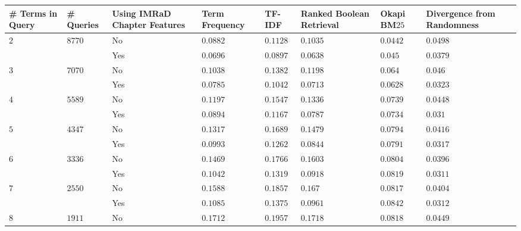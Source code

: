 \begin{table}[h]
  \begin{adjustwidth}{-2cm}{}
    \begin{tabular}{ C{1cm} C{1cm} C{2.1cm}|C{2.1cm} C{2.1cm} C{2.1cm} C{2.1cm} C{2.1cm} }
      \toprule
      \textbf{\# Terms in Query} & \textbf{\# Queries} & \textbf{Using IMRaD Chapter Features} & \textbf{Term Frequency} & \textbf{TF-IDF} & \textbf{Ranked Boolean Retrieval} & \textbf{Okapi BM$25$} & \textbf{Divergence from Randomness} \\ \midrule
       &  & No  & $0.0882$ & $0.1128$ & $0.1035$ & $0.0442$ & \color{blue}$\mathbf{0.0498}$  \\
                                                    && Yes & $0.0696$ & $0.0897$ & $0.0638$ & $0.045$  & \color{Plum}$\mathbf{0.0379}$  \\ \midrule
       &  & No  & $0.1038$ & $0.1382$ & $0.1198$ & $0.064$  & $0.046$   \\
                                                    && Yes & $0.0785$ & $0.1042$ & $0.0713$ & $0.0628$ & $0.0323$  \\ \midrule
       &  & No  & $0.1197$ & $0.1547$ & $0.1336$ & $0.0739$ & $0.0448$  \\
                                                    && Yes & $0.0894$ & $0.1167$ & $0.0787$ & $0.0734$ & $0.031$   \\ \midrule
       &  & No  & $0.1317$ & $0.1689$ & $0.1479$ & $0.0794$ & $0.0416$  \\
                                                    && Yes & $0.0993$ & $0.1262$ & $0.0844$ & $0.0791$ & $0.0317$  \\ \midrule
       &  & No  & $0.1469$ & $0.1766$ & $0.1603$ & $0.0804$ & $0.0396$  \\
                                                    && Yes & $0.1042$ & $0.1319$ & $0.0918$ & $0.0819$ & $0.0311$  \\ \midrule
       &  & No  & $0.1588$ & $0.1857$ & $0.167$  & $0.0817$ & $0.0404$  \\
                                                    && Yes & $0.1085$ & $0.1375$ & $0.0961$ & $0.0842$ & $0.0312$  \\ \midrule
       &  & No  & $0.1712$ & $0.1957$ & $0.1718$ & $0.0818$ & $0.0449$  \\

\end{tabular}
\end{adjustwidth}
\end{table}
